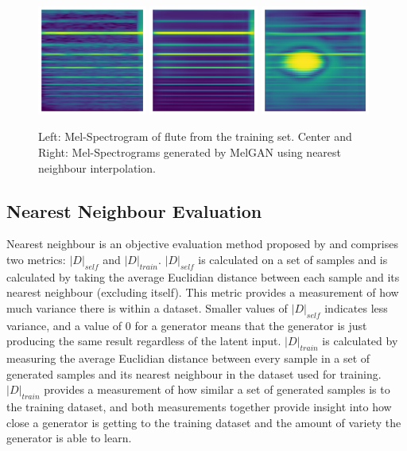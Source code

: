 \begin{figure}
\centering
\includegraphics[width=0.32\textwidth]{MelGAN_Train.png}
\includegraphics[width=0.32\textwidth]{MelGAN_Generated.png}
\includegraphics[width=0.32\textwidth]{MelGAN_Blob.png}
\caption{Left: Mel-Spectrogram of flute from the training set. Center and Right: Mel-Spectrograms generated by MelGAN using nearest neighbour interpolation.}
\label{fig:melgan}
\end{figure}

\subsection{Nearest Neighbour Evaluation}\label{sec:nearest_evaluation}
Nearest neighbour is an objective evaluation method proposed by \cite{donahue2018adversarial} and comprises two metrics: $|D|_{self}$ and $|D|_{train}$. $|D|_{self}$ is calculated on a set of samples and is calculated by taking the average Euclidian distance between each sample and its nearest neighbour (excluding itself). This metric provides a measurement of how much variance there is within a dataset. Smaller values of $|D|_{self}$ indicates less variance, and a value of 0 for a generator means that the generator is just producing the same result regardless of the latent input. $|D|_{train}$ is calculated by measuring the average Euclidian distance between every sample in a set of generated samples and its nearest neighbour in the dataset used for training. $|D|_{train}$ provides a measurement of how similar a set of generated samples is to the training dataset, and both measurements together provide insight into how close a generator is getting to the training dataset and the amount of variety the generator is able to learn.

